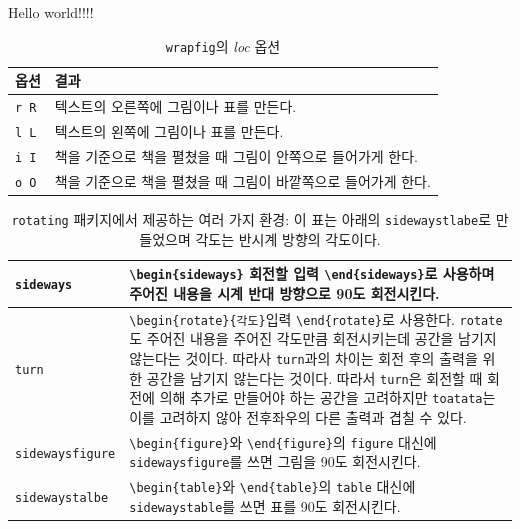 \documentclass[11pt]{article}
\begin{document}
Hello world!!!!

\newpage \clearpage
\begin{table}
\caption{\texttt{wrapfig}의 \emph{loc} 옵션 \label{tab:wraptable}}
\begin{tabular}{p{2cm}|p{5cm}} \hline
옵션 & 결과 \\ \hline
\texttt{r R} & 텍스트의 오른쪽에 그림이나 표를 만든다. \\
\texttt{l L} & 텍스트의 왼쪽에 그림이나 표를 만든다. \\
\texttt{i I} & 책을 기준으로 책을 펼쳤을 때 그림이 안쪽으로 들어가게 한다. \\
\texttt{o O} & 책을 기준으로 책을 펼쳤을 때 그림이 바깥쪽으로 들어가게 한다. \\ \hline
\end{tabular}
\end{table}


\begin{table}
\caption[\texttt{rotating} 패키지에서 제공하는 환경] {\texttt{rotating} 패키지에서 제공하는 여러 가지 환경: 이 표는 아래의 \texttt{sidewaystlabe}로 만들었으며 각도는 반시계 방향의 각도이다.
\label{tab:sidewaystable}}
\begin{center}
\begin{tabular}{|l||p{5in}|} \hline
\texttt{sideways} & \verb|\begin{sideways}| 회전할 입력 \verb|\end{sideways}|로 사용하며 주어진 내용을 시계 반대 방향으로 90도 회전시킨다. \\ \hline
\texttt{turn} & \verb|\begin{rotate}{각도}|입력 \verb|\end{rotate}|로 사용한다. \texttt{rotate}도 주어진 내용을 주어진 각도만큼 회전시키는데 공간을 남기지 않는다는 것이다. 따라사 \texttt{turn}과의 차이는 회전 후의 출력을 위한 공간을 남기지 않는다는 것이다. 따라서 \texttt{turn}은 회전할 때 회전에 의해 추가로 만들어야 하는 공간을 고려하지만 \texttt{toatata}는 이를 고려하지 않아 전후좌우의 다른 출력과 겹칠 수 있다. \\ \hline
\texttt{sidewaysfigure} & \verb|\begin{figure}|와 \verb|\end{figure}|의 \texttt{figure} 대신에 \texttt{sidewaysfigure}를 쓰면 그림을 90도 회전시킨다. \\ \hline
\texttt{sidewaystalbe} & \verb|\begin{table}|와 \verb|\end{table}|의 \texttt{table} 대신에 \texttt{sidewaystable}를 쓰면 표를 90도 회전시킨다. \\ \hline
\end{tabular}
\end{center}
\end{table}
\end{document}
